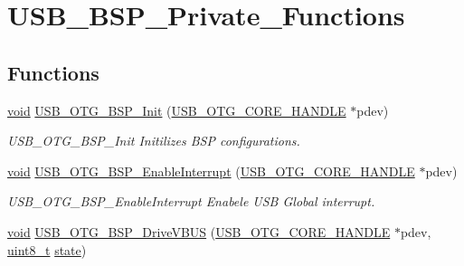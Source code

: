 \hypertarget{group___u_s_b___b_s_p___private___functions}{\section{U\-S\-B\-\_\-\-B\-S\-P\-\_\-\-Private\-\_\-\-Functions}
\label{group___u_s_b___b_s_p___private___functions}
}
\subsection*{Functions}
\begin{DoxyCompactItemize}
\item 
\hyperlink{group___n_a_m_e_ga18028b8badbf1ea7e704ccac3c488e82}{void} \hyperlink{group___u_s_b___b_s_p___private___functions_gacffb89e4346b11dee704fe5a40326a1f}{U\-S\-B\-\_\-\-O\-T\-G\-\_\-\-B\-S\-P\-\_\-\-Init} (\hyperlink{group___u_s_b___c_o_r_e___exported___types_gaf76054c11eb8a3367907aad7ae700e80}{U\-S\-B\-\_\-\-O\-T\-G\-\_\-\-C\-O\-R\-E\-\_\-\-H\-A\-N\-D\-L\-E} $\ast$pdev)
\begin{DoxyCompactList}\small\item\em U\-S\-B\-\_\-\-O\-T\-G\-\_\-\-B\-S\-P\-\_\-\-Init Initilizes B\-S\-P configurations. \end{DoxyCompactList}\item 
\hyperlink{group___n_a_m_e_ga18028b8badbf1ea7e704ccac3c488e82}{void} \hyperlink{group___u_s_b___b_s_p___private___functions_ga38bdd94d09d00f27d1343fdb0babdfa1}{U\-S\-B\-\_\-\-O\-T\-G\-\_\-\-B\-S\-P\-\_\-\-Enable\-Interrupt} (\hyperlink{group___u_s_b___c_o_r_e___exported___types_gaf76054c11eb8a3367907aad7ae700e80}{U\-S\-B\-\_\-\-O\-T\-G\-\_\-\-C\-O\-R\-E\-\_\-\-H\-A\-N\-D\-L\-E} $\ast$pdev)
\begin{DoxyCompactList}\small\item\em U\-S\-B\-\_\-\-O\-T\-G\-\_\-\-B\-S\-P\-\_\-\-Enable\-Interrupt Enabele U\-S\-B Global interrupt. \end{DoxyCompactList}\item 
\hyperlink{group___n_a_m_e_ga18028b8badbf1ea7e704ccac3c488e82}{void} \hyperlink{group___u_s_b___b_s_p___private___functions_ga1a0b196001899cd61bc722d080ca8161}{U\-S\-B\-\_\-\-O\-T\-G\-\_\-\-B\-S\-P\-\_\-\-Drive\-V\-B\-U\-S} (\hyperlink{group___u_s_b___c_o_r_e___exported___types_gaf76054c11eb8a3367907aad7ae700e80}{U\-S\-B\-\_\-\-O\-T\-G\-\_\-\-C\-O\-R\-E\-\_\-\-H\-A\-N\-D\-L\-E} $\ast$pdev, \hyperlink{stdint_8h_aba7bc1797add20fe3efdf37ced1182c5}{uint8\-\_\-t} \hyperlink{posix_2posix_2pios__flashfs__logfs_8c_a13a6109e91ad12705df96a0f2743c630}{state})

\end{DoxyCompactItemize}
